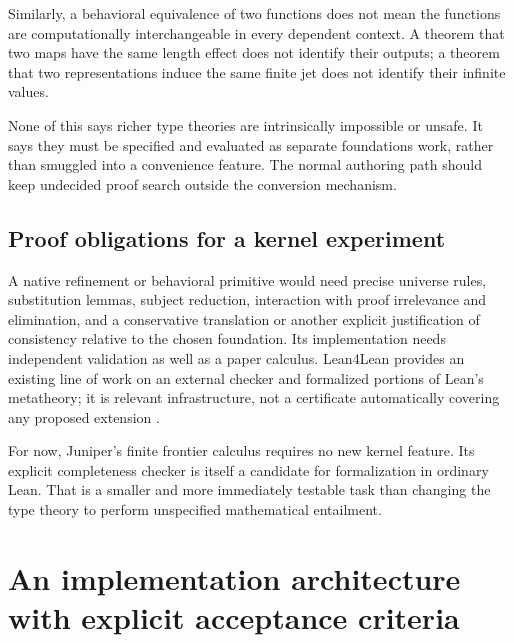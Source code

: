 \documentclass[11pt,a4paper]{article}
\theoremstyle{definition}\newtheorem{definition}[theorem]{Definition}
\theoremstyle{remark}\newtheorem{remark}[theorem]{Remark}
\begin{document}
Similarly, a behavioral equivalence of two functions does not mean the functions are computationally interchangeable in every dependent context. A theorem that two maps have the same length effect does not identify their outputs; a theorem that two representations induce the same finite jet does not identify their infinite values.

None of this says richer type theories are intrinsically impossible or unsafe. It says they must be specified and evaluated as separate foundations work, rather than smuggled into a convenience feature. The normal authoring path should keep undecided proof search outside the conversion mechanism.

\subsection{Proof obligations for a kernel experiment}
A native refinement or behavioral primitive would need precise universe rules, substitution lemmas, subject reduction, interaction with proof irrelevance and elimination, and a conservative translation or another explicit justification of consistency relative to the chosen foundation. Its implementation needs independent validation as well as a paper calculus. Lean4Lean provides an existing line of work on an external checker and formalized portions of Lean's metatheory; it is relevant infrastructure, not a certificate automatically covering any proposed extension \cite{lean4lean}.

For now, Juniper's finite frontier calculus requires no new kernel feature. Its explicit completeness checker is itself a candidate for formalization in ordinary Lean. That is a smaller and more immediately testable task than changing the type theory to perform unspecified mathematical entailment.

\section{An implementation architecture with explicit acceptance criteria}
\label{sec:architecture}
\end{document}
